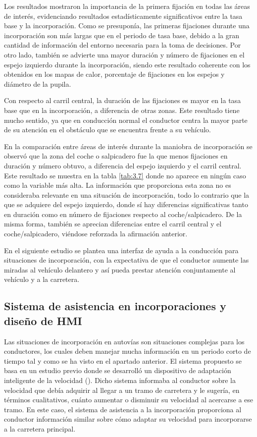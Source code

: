 Los resultados mostraron la importancia de la primera fijación en todas las áreas de interés, evidenciando resultados estadísticamente significativos entre la tasa base y la incorporación. Como se presuponía, las primeras fijaciones durante una incorporación son más largas que en el periodo de tasa base, debido a la gran cantidad de información del entorno necesaria para la toma de decisiones. Por otro lado, también se advierte una mayor duración y número de fijaciones en el espejo izquierdo durante la incorporación, siendo este resultado coherente con los obtenidos en los mapas de calor, porcentaje de fijaciones en los espejos y diámetro de la pupila. 

Con respecto al carril central, la duración de las fijaciones es mayor en la tasa base que en la incorporación, a diferencia de otras zonas. Este resultado tiene mucho sentido, ya que en conducción normal el conductor centra la mayor parte de su atención en el obstáculo que se encuentra frente a su vehículo. 

En la comparación entre áreas de interés durante la maniobra de incorporación se observó que la zona del coche o salpicadero fue la que menos fijaciones en duración y número obtuvo, a diferencia del espejo izquierdo y el carril central. Este resultado se muestra en la tabla \ref{tab:3.7} donde no aparece en ningún caso como la variable más alta. La información que proporciona esta zona no es consideraba relevante en una situación de incorporación, todo lo contrario que la que se adquiere del espejo izquierdo, donde sí hay diferencias significativas tanto en duración como en número de fijaciones respecto al coche/salpicadero. De la misma forma, también se aprecian diferencias entre el carril central y el coche/salpicadero, viéndose reforzada la afirmación anterior.

En el siguiente estudio se plantea una interfaz de ayuda a la conducción para situaciones de incorporación, con la expectativa de que el conductor aumente las miradas al vehículo delantero y así pueda prestar atención conjuntamente al vehículo y a la carretera. 

\subsection{Sistema de asistencia en incorporaciones y diseño de HMI}\label{313}

Las situaciones de incorporación en autovías son situaciones complejas para los conductores, los cuales deben manejar mucha información en un periodo corto de tiempo tal y como se ha visto en el apartado anterior. El sistema propuesto se basa en un estudio previo donde se desarrolló un dispositivo de adaptación inteligente de la velocidad (\cite{jimenez12}). Dicho sistema informaba al conductor sobre la velocidad que debía adquirir al llegar a un tramo de carretera y le sugería, en términos cualitativos, cuánto aumentar o disminuir su velocidad al acercarse a ese tramo. En este caso, el sistema de asistencia a la incorporación proporciona al conductor información similar sobre cómo adaptar su velocidad para incorporarse a la carretera principal. 

